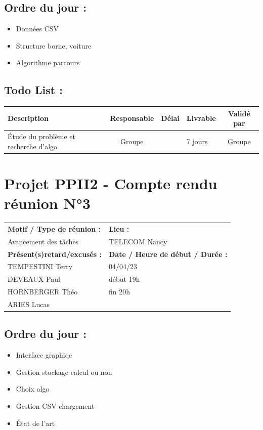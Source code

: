 \documentclass[12pt,titlepage]{report}
\begin{document}
\subsection*{Ordre du jour :}
\begin{itemize}
    \item{Données CSV}
    \item{Structure borne, voiture}
    \item{Algorithme parcours}
\end{itemize}

\subsection*{Todo List :}
\begin{tabular}{|p{3.5cm}|c|c|p{4.5cm}|c|}
    \hline 
    Description & Responsable & Délai & Livrable & Validé par 
    \\ \hline
    Étude du problème et recherche d'algo & Groupe &  & 7 jours & Groupe  \\\hline

\end{tabular}

\newpage

\section*{Projet PPII2 - Compte rendu réunion N°3}
\begin{tabular}{|p{7cm}|p{6cm}|}
    \hline
    \textbf{Motif / Type de réunion :}
    & \textbf{Lieu :}
    \\
    Avancement des tâches
    & 
    TELECOM Nancy
    \\ \hline
    \textbf{Présent(s)retard/excusés :}
    &
    \textbf{Date / Heure de début / Durée :}
    \\ 
    TEMPESTINI Terry &  04/04/23\\  
    DEVEAUX Paul & début 19h\\
    HORNBERGER Théo & fin 20h\\
    ARIES Lucas & 
    \\ \hline
\end{tabular}

\subsection*{Ordre du jour :}
\begin{itemize}
    \item{Interface graphiqe}
    \item{Gestion stockage calcul ou non}
    \item{Choix algo}
    \item{Gestion CSV chargement}
    \item{État de l'art}
\end{itemize}
\end{document}
